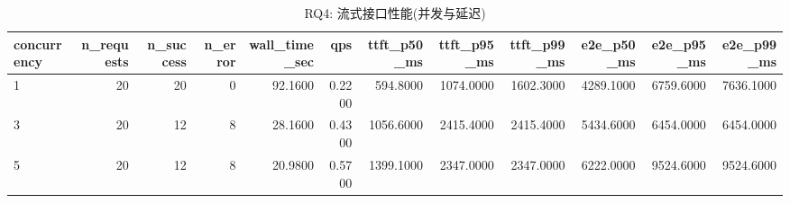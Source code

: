 \begin{table}[t]
\centering
\caption{RQ4: 流式接口性能(并发与延迟)}
\label{tab:rq4}
\begin{tabular}{lrrrrrrrrrrr}
\toprule
concurrency & n\_requests & n\_success & n\_error & wall\_time\_sec & qps & ttft\_p50\_ms & ttft\_p95\_ms & ttft\_p99\_ms & e2e\_p50\_ms & e2e\_p95\_ms & e2e\_p99\_ms \\
\midrule
1 & 20 & 20 & 0 & 92.1600 & 0.2200 & 594.8000 & 1074.0000 & 1602.3000 & 4289.1000 & 6759.6000 & 7636.1000 \\
3 & 20 & 12 & 8 & 28.1600 & 0.4300 & 1056.6000 & 2415.4000 & 2415.4000 & 5434.6000 & 6454.0000 & 6454.0000 \\
5 & 20 & 12 & 8 & 20.9800 & 0.5700 & 1399.1000 & 2347.0000 & 2347.0000 & 6222.0000 & 9524.6000 & 9524.6000 \\
\bottomrule
\end{tabular}
\end{table}